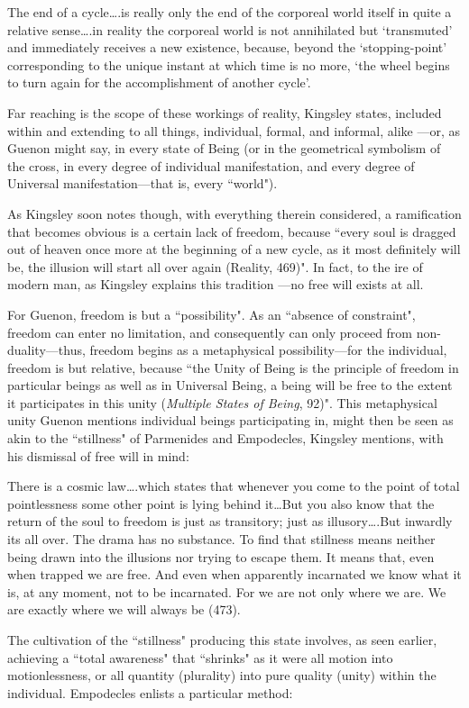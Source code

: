 \begin{quotex}
The end of a cycle….is really only the end of the corporeal world itself in quite a relative sense….in reality the corporeal world is not annihilated but `transmuted' and immediately receives a new existence, because, beyond the `stopping-point' corresponding to the unique instant at which time is no more, `the wheel begins to turn again for the accomplishment of another cycle'. 

\end{quotex}
Far reaching is the scope of these workings of reality, Kingsley states, included within and extending to all things, individual, formal, and informal, alike —or, as Guenon might say, in every state of Being (or in the geometrical symbolism of the cross, in every degree of individual manifestation, and every degree of Universal manifestation—that is, every ``world").

As Kingsley soon notes though, with everything therein considered, a ramification that becomes obvious is a certain lack of freedom, because ``every soul is dragged out of heaven once more at the beginning of a new cycle, as it most definitely will be, the illusion will start all over again (Reality, 469)". In fact, to the ire of modern man, as Kingsley explains this tradition —no free will exists at all.

For Guenon, freedom is but a ``possibility". As an ``absence of constraint", freedom can enter no limitation, and consequently can only proceed from non-duality—thus, freedom begins as a metaphysical possibility—for the individual, freedom is but relative, because ``the Unity of Being is the principle of freedom in particular beings as well as in Universal Being, a being will be free to the extent it participates in this unity (\textit{Multiple States of Being}, 92)". This metaphysical unity Guenon mentions individual beings participating in, might then be seen as akin to the ``stillness" of Parmenides and Empodecles, Kingsley mentions, with his dismissal of free will in mind:

\begin{quotex}
There is a cosmic law….which states that whenever you come to the point of total pointlessness some other point is lying behind it…But you also know that the return of the soul to freedom is just as transitory; just as illusory….But inwardly its all over. The drama has no substance. To find that stillness means neither being drawn into the illusions nor trying to escape them. It means that, even when trapped we are free. And even when apparently incarnated we know what it is, at any moment, not to be incarnated. For we are not only where we are. We are exactly where we will always be (473).

\end{quotex}
The cultivation of the ``stillness" producing this state involves, as seen earlier, achieving a ``total awareness" that ``shrinks" as it were all motion into motionlessness, or all quantity (plurality) into pure quality (unity) within the individual. Empodecles enlists a particular method:

